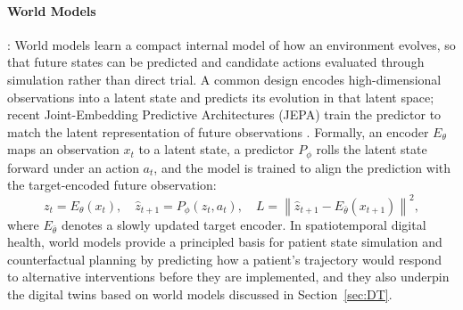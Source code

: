 \documentclass[acmsmall]{acmart}
\begin{document}
\paragraph{World Models}: World models learn a compact internal model of how an environment evolves, so that future states can be predicted and candidate actions evaluated through simulation rather than direct trial. A common design encodes high-dimensional observations into a latent state and predicts its evolution in that latent space; recent Joint-Embedding Predictive Architectures (JEPA) train the predictor to match the latent representation of future observations \cite{maes2026leworldmodel}. Formally, an encoder $E_\theta$ maps an observation $x_t$ to a latent state, a predictor $P_\phi$ rolls the latent state forward under an action $a_t$, and the model is trained to align the prediction with the target-encoded future observation:
\begin{equation}
z_t = E_\theta(x_t), \quad \hat{z}_{t+1} = P_\phi(z_t, a_t), \quad L = \left\| \hat{z}_{t+1} - E_{\bar{\theta}}(x_{t+1}) \right\|^2,
\end{equation}
where $E_{\bar{\theta}}$ denotes a slowly updated target encoder. In spatiotemporal digital health, world models provide a principled basis for patient state simulation and counterfactual planning by predicting how a patient's trajectory would respond to alternative interventions before they are implemented, and they also underpin the digital twins based on world models discussed in Section~\ref{sec:DT}.


\end{document}
